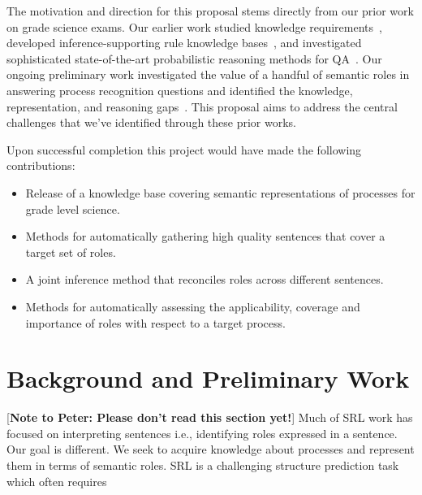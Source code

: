 The motivation and direction for this proposal stems directly from our prior work on grade science exams.  Our earlier work studied knowledge requirements~\cite{chb2013:akbc}, developed inference-supporting rule knowledge bases~\cite{clark2014:akbc}, and investigated sophisticated state-of-the-art probabilistic reasoning methods for QA~\cite{khot2015:emlnlp}. Our ongoing preliminary work investigated the value of a handful of semantic roles in answering process recognition questions and identified the knowledge, representation, and reasoning gaps~\cite{louvan2015:kcap}. This proposal aims to address the central challenges that we've identified through these prior works.

Upon successful completion this project would have made the following contributions:
\begin{itemize}
\item Release of a knowledge base covering semantic representations of processes for grade level science.
\item Methods for automatically gathering high quality sentences that cover a target set of roles. 
\item A joint inference method that reconciles roles across different sentences.  
\item Methods for automatically assessing the applicability, coverage and importance of roles with respect to a target process.
\end{itemize}

 




\section{Background and Preliminary Work}
[{\bf Note to Peter: Please don't read this section yet!}]
Much of SRL work has focused on interpreting sentences i.e., identifying roles expressed in a sentence.
Our goal is different. 
We seek to acquire knowledge about processes and represent them in terms of semantic roles.
SRL is a challenging structure prediction task which often requires 

